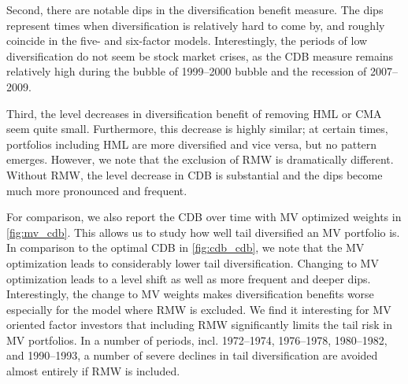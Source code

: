 Second, there are notable dips in the diversification benefit measure. The dips represent times when diversification is relatively hard to come by, and roughly coincide in the five- and six-factor models. Interestingly, the periods of low diversification do not seem be stock market crises, as the CDB measure remains relatively high during the bubble of 1999--2000 bubble and the recession of 2007--2009.

Third, the level decreases in diversification benefit of removing HML or CMA seem quite small. Furthermore, this decrease is highly similar; at certain times, portfolios including HML are more diversified and vice versa, but no pattern emerges. However, we note that the exclusion of RMW is dramatically different. Without RMW, the level decrease in CDB is substantial and the dips become much more pronounced and frequent. 

For comparison, we also report the CDB over time with MV optimized weights in \autoref{fig:mv_cdb}. This allows us to study how well tail diversified an MV portfolio is. In comparison to the optimal CDB in \autoref{fig:cdb_cdb}, we note that the MV optimization leads to considerably lower tail diversification. Changing to MV optimization leads to a level shift as well as more frequent and deeper dips. Interestingly, the change to MV weights makes diversification benefits worse especially for the model where RMW is excluded. We find it interesting for MV oriented factor investors that including RMW significantly limits the tail risk in MV portfolios. In a number of periods, incl. 1972--1974, 1976--1978, 1980--1982, and 1990--1993, a number of severe declines in tail diversification are avoided almost entirely if RMW is included. 

